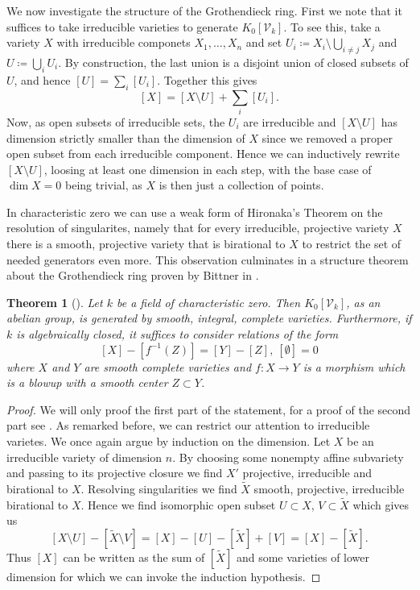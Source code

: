\documentclass[11pt, a4paper, german, twoside]{article}
\theoremstyle{plain}
\newtheorem{theorem}{Theorem}[section]
\theoremstyle{definition}
\newcommand{\gring}[1][k]{K_0[\mathcal{V}_#1]}
\begin{document}
We now investigate the structure of the Grothendieck ring. First we note that it suffices to take irreducible varieties to generate $\gring[k]$.
To see this, take a variety $X$ with irreducible componets $X_1, \dots, X_n$ and set ${U_i \coloneqq X_i \setminus \bigcup_{i \neq j} X_j}$ and
$U \coloneqq \bigcup_i U_i$. By construction, the last union is a disjoint union of closed subsets of $U$, 
and hence $[U] = \sum_i [U_i]$. Together this gives
\[
    [X] = [X \setminus U] + \sum_i [U_i].
\] Now, as open subsets of irreducible sets, the $U_i$ are irreducible and $[X \setminus U]$ has dimension
strictly smaller than the dimension of $X$ since we removed a proper open subset from each irreducible component. Hence we can inductively
rewrite $[X \setminus U]$, loosing at least one dimension in each step, with the base case of $\dim  X = 0$ being trivial, as $X$ is then
just a collection of points.

In characteristic zero we can use a weak form of Hironaka's Theorem on the resolution of singularites, namely that for every irreducible, 
projective variety $X$ there is a smooth, projective variety that is birational to $X$ to restrict the set of needed generators even more. 
This observation culminates in a structure theorem about the Grothendieck ring proven by Bittner in \cite{Bittner}.


\begin{theorem}[{\cite[Thm. 3.1]{Bittner}}]
    \label{bittner}
    Let $k$ be a field of characteristic zero. Then $\gring[k]$, as an abelian group, is generated by smooth, integral, complete varieties.
    Furthermore, if $k$ is algebraically closed, it suffices to consider relations of the form
    \[
        [X] - [f^{-1}(Z)] = [Y] - [Z],\ [\emptyset] = 0
    \]
    where $X$ and $Y$ are smooth complete varieties and $f \colon X \to Y$ is a morphism which is a blowup with a smooth center $Z \subset Y$. 
\end{theorem}
\begin{proof}
    We will only proof the first part of the statement, for a proof of the second part see \cite{Bittner}. As remarked before, we can restrict our
    attention to irreducible varietes.  We once again argue by induction on the dimension.
    Let $X$ be an irreducible variety of dimension $n$. By choosing some nonempty affine subvariety and passing to its projective closure we
    find $X'$ projective, irreducible and birational to $X$. Resolving singularities we find $\widetilde{X}$ smooth, projective, irreducible
    birational to $X$. Hence we find isomorphic open subset $U \subset X$, $V \subset \widetilde{X}$ which gives us
    \[
        [X \setminus U ] - [\widetilde{X} \setminus V] = [X] - [U] - [\widetilde{X}] + [V] = [X] - [\widetilde{X}].
    \]
    Thus $[X]$ can be written as the sum of $[\widetilde{X}]$ and some varieties of lower dimension for which we can invoke the induction
    hypothesis.
\end{proof}
\end{document}
